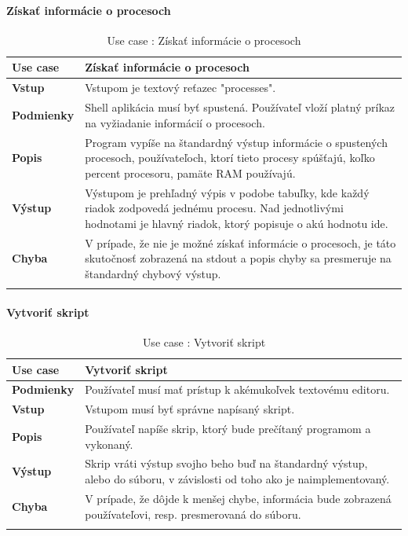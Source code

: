 \paragraph{Získať informácie o procesoch}
\begin{center}
	\begin{longtable}{|p{2.5cm}|p{12.2cm}|}
		
			\hline
			\textbf{Use case} & Získať informácie o procesoch \\ 
			\hline
			\textbf{Vstup} & Vstupom je textový reťazec "processes".\\
			\hline
			\textbf{Podmienky} & Shell aplikácia musí byť spustená. Používateľ vloží platný príkaz na vyžiadanie informácií o procesoch. \\ 
			\hline

			\textbf{Popis} & Program vypíše na štandardný výstup informácie o spustených procesoch, používateľoch, ktorí tieto procesy spúšťajú, koľko percent procesoru, pamäte RAM používajú.\\ 
			\hline

			\textbf{Výstup} & Výstupom je prehľadný výpis v podobe tabuľky, kde každý riadok zodpovedá jednému procesu. Nad jednotlivými hodnotami je hlavný riadok, ktorý popisuje o akú hodnotu ide.\\
			\hline
			\textbf{Chyba} & V prípade, že nie je možné získať informácie o procesoch, je táto skutočnosť zobrazená na stdout a popis chyby sa presmeruje na štandardný chybový výstup.\\
			\hline
		\caption{Use case : Získať informácie o procesoch}
		\label{table:1}
		
	\end{longtable}
\end{center}
\paragraph{Vytvoriť skript}
\begin{center}
	\begin{longtable}{|p{2.5cm}|p{12.2cm}|}
		
			\hline
			\textbf{Use case} & Vytvoriť skript \\ 
			\hline
			\textbf{Podmienky} & Používateľ musí mať prístup k akémukoľvek textovému editoru.  \\ 
			\hline
			\textbf{Vstup} & Vstupom musí byť správne napísaný skript. \\
			\hline
			\textbf{Popis} & Používateľ napíše skrip, ktorý bude prečítaný programom a vykonaný.\\ 
			\hline
			\textbf{Výstup} & Skrip vráti výstup svojho beho buď na štandardný výstup, alebo do súboru, v závislosti od toho ako je naimplementovaný.\\
			\hline
			\textbf{Chyba} & V prípade, že dôjde k menšej chybe, informácia bude zobrazená používateľovi, resp. presmerovaná do súboru.\\
			\hline
		\caption{Use case : Vytvoriť skript}
		\label{table:1}
		
	\end{longtable}
\end{center}
